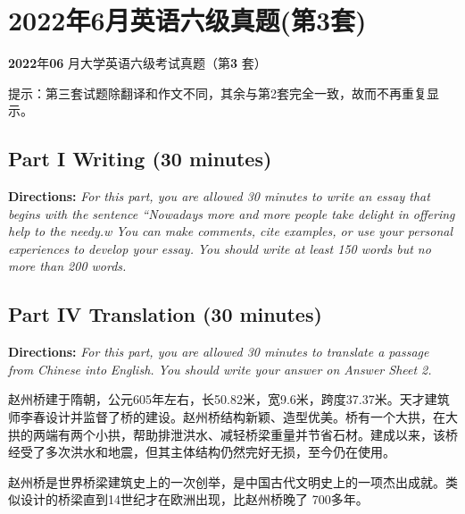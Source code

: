 \documentclass[UTF8,11pt]{ctexart}
\begin{document}
\section*{2022年6月英语六级真题(第3套)}
\textbf{2022}年\textbf{06} 月大学英语六级考试真题（第\textbf{3} 套）


提示：第三套试题除翻译和作文不同，其余与第2套完全一致，故而不再重复显示。


\subsection*{\textbf{Part I} \textbf{Writing} \textbf{(30 minutes)}}


\textbf{Directions: }\textit{For this part, you are allowed 30 minutes to write an essay that begins with the} \textit{sentence “Nowadays more and more people take delight in offering help to the needy.w You} \textit{can make comments, cite examples, or use your personal experiences to develop your essay.} \textit{You should write at least 150 words but no more than 200 words.}


\subsection*{\textbf{Part IV} \textbf{Translation} \textbf{(30 minutes)}}


\textbf{Directions: }\textit{For this part, you are allowed 30 minutes to translate a passage from Chinese into} \textit{English. You should write your answer on Answer Sheet 2.}


赵州桥建于隋朝，公元605年左右，长50.82米，宽9.6米，跨度37.37米。天才建筑师李春设计并监督了桥的建设。赵州桥结构新颖、造型优美。桥有一个大拱，在大拱的两端有两个小拱，帮助排泄洪水、减轻桥梁重量并节省石材。建成以来，该桥经受了多次洪水和地震，但其主体结构仍然完好无损，至今仍在使用。


赵州桥是世界桥梁建筑史上的一次创举，是中国古代文明史上的一项杰出成就。类似设计的桥梁直到14世纪才在欧洲出现，比赵州桥晚了 700多年。
\end{document}
